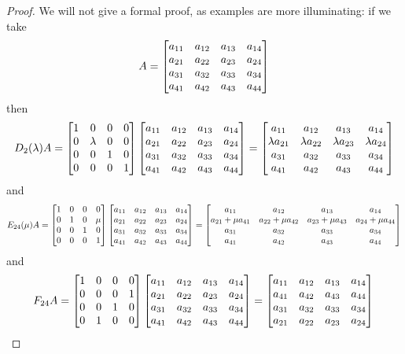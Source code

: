 \documentclass[reqno]{amsart}
\theoremstyle{definition}
\begin{document}
\begin{proof}
We will not give a formal proof, as examples are more illuminating:
if we take
\[ A = \left[\begin{matrix}
        a_{11} & a_{12} & a_{13} & a_{14} \\
        a_{21} & a_{22} & a_{23} & a_{24} \\
        a_{31} & a_{32} & a_{33} & a_{34} \\
        a_{41} & a_{42} & a_{43} & a_{44}
       \end{matrix}\right]
\]
then
\[
 D_2(\lambda)A =
    \left[\begin{matrix}
     1 & 0 & 0 & 0 \\
     0 & \lambda & 0 & 0 \\
     0 & 0 & 1 & 0 \\
     0 & 0 & 0 & 1
    \end{matrix}\right]
    \left[\begin{matrix}
     a_{11} & a_{12} & a_{13} & a_{14} \\
     a_{21} & a_{22} & a_{23} & a_{24} \\
     a_{31} & a_{32} & a_{33} & a_{34} \\
     a_{41} & a_{42} & a_{43} & a_{44}
    \end{matrix}\right]
    =
    \left[\begin{matrix}
     a_{11} & a_{12} & a_{13} & a_{14} \\
     \lambda a_{21} & \lambda a_{22} & \lambda a_{23} & \lambda a_{24} \\
     a_{31} & a_{32} & a_{33} & a_{34} \\
     a_{41} & a_{42} & a_{43} & a_{44}
    \end{matrix}\right]
\]
and
\[
 E_{24}(\mu)A =
    \left[\begin{matrix}
     1 & 0 & 0 & 0 \\
     0 & 1 & 0 & \mu \\
     0 & 0 & 1 & 0 \\
     0 & 0 & 0 & 1
    \end{matrix}\right]
    \left[\begin{matrix}
     a_{11} & a_{12} & a_{13} & a_{14} \\
     a_{21} & a_{22} & a_{23} & a_{24} \\
     a_{31} & a_{32} & a_{33} & a_{34} \\
     a_{41} & a_{42} & a_{43} & a_{44}
    \end{matrix}\right]
    =
    \left[\begin{matrix}
     a_{11} & a_{12} & a_{13} & a_{14} \\
     a_{21}+\mu a_{41} & a_{22}+\mu a_{42} & a_{23}+\mu a_{43} & a_{24}+\mu a_{44} \\
     a_{31} & a_{32} & a_{33} & a_{34} \\
     a_{41} & a_{42} & a_{43} & a_{44}
    \end{matrix}\right]
\]
and
\[
 F_{24}A =
    \left[\begin{matrix}
     1 & 0 & 0 & 0 \\
     0 & 0 & 0 & 1 \\
     0 & 0 & 1 & 0 \\
     0 & 1 & 0 & 0
    \end{matrix}\right]
    \left[\begin{matrix}
     a_{11} & a_{12} & a_{13} & a_{14} \\
     a_{21} & a_{22} & a_{23} & a_{24} \\
     a_{31} & a_{32} & a_{33} & a_{34} \\
     a_{41} & a_{42} & a_{43} & a_{44}
    \end{matrix}\right]
    =
    \left[\begin{matrix}
     a_{11} & a_{12} & a_{13} & a_{14} \\
     a_{41} & a_{42} & a_{43} & a_{44} \\
     a_{31} & a_{32} & a_{33} & a_{34} \\
     a_{21} & a_{22} & a_{23} & a_{24}
    \end{matrix}\right]
    \qedhere
\]
\end{proof}
\end{document}
